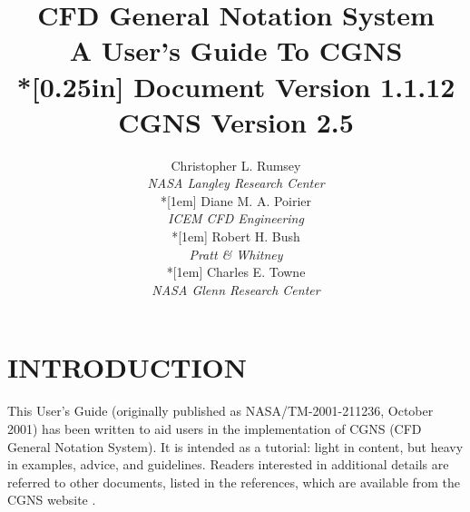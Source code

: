 \documentclass[12pt]{article}
\begin{document}
\posttitle{\par\end{flushleft}\vskip 0.5in}
\preauthor{\begin{flushleft}}
\postauthor{\par\end{flushleft}}
\title{{\bfseries CFD General Notation System\\
A User's Guide To CGNS}\\*[0.25in]
{\Large Document Version 1.1.12\\
CGNS Version 2.5}}
\author{Christopher L. Rumsey\\
\textit{NASA Langley Research Center}\\*[1em]
Diane M. A. Poirier\\
\textit{ICEM CFD Engineering}\\*[1em]
Robert H. Bush\\
\textit{Pratt \& Whitney}\\*[1em]
Charles E. Towne\\
\textit{NASA Glenn Research Center}}
\date{}
\maketitle
\thispagestyle{empty}

%
\newpage
\thispagestyle{empty}
\tableofcontents

\newpage
\renewcommand{\thepage}{\arabic{page}}
\section{INTRODUCTION}

This User's Guide (originally published as NASA/TM-2001-211236, October
2001) has been written to aid users in the implementation of CGNS (CFD
General Notation System).
It is intended as a tutorial: light in content, but
heavy in examples, advice, and guidelines.  Readers interested in
additional details are referred to other documents, listed in the references,
which are available from the CGNS website .
\end{document}
